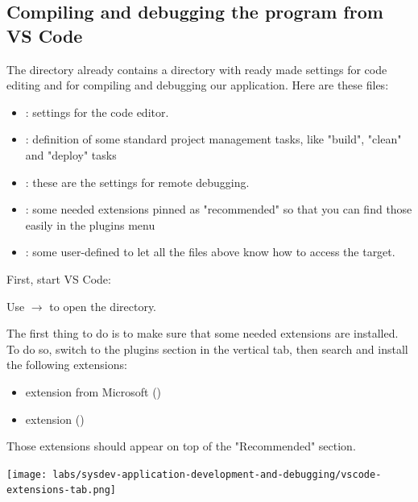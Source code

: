 
\subsection{Compiling and debugging the program from VS Code}

The  directory already contains a  directory
with ready made settings for code editing and for compiling and debugging
our application. Here are these files:

\begin{itemize}
	\item {}: settings for the code editor.
	\item {}: definition of some standard project
		management tasks, like "build", "clean" and "deploy" tasks
	\item {}: these are the settings for remote
		debugging.
	\item {}: some needed extensions pinned as
		"recommended" so that you can find those easily in the plugins
		menu
	\item {}: some user-defined to let all the files above know how
		to access the target.
\end{itemize}

First, start VS Code:


Use  $\rightarrow$  to open the
 directory.

The first thing to do is to make sure that some needed extensions are
installed. To do so, switch to the plugins section in the vertical tab,
then search and install the following extensions:
\begin{itemize}
	\item {} extension from Microsoft
		()
	\item {} extension
		()
\end{itemize}
Those extensions should appear on top of the "Recommended" section.

\texttt{[image: labs/sysdev-application-development-and-debugging/vscode-extensions-tab.png]}

